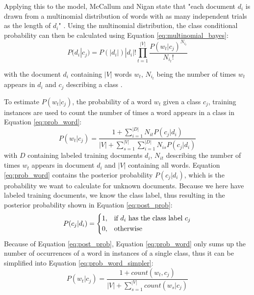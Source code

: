         Applying this to the model, McCallum and Nigan state that "each document $d_i$ is drawn from a multinomial distribution of words with as many independent trials as the length of $d_i$" \cite[p.~3]{Mccallum1998}. Using the multinomial distribution, the class conditional probability can then be calculated using Equation \eqref{eq:multinomial_bayes}:
        \begin{equation}
            \label{eq:multinomial_bayes}
                P(d_i|c_j) = P(|d_i|)|d_i|!\prod_{t=1}^{|V|}\frac{P(w_t|c_j)^{N_{i_t}}}{N_{i_t}!}
        \end{equation}
        
        with the document $d_i$ containing $|V|$ words $w_t$, $N_{i_t}$ being the number of times $w_t$ appears in $d_i$ and $c_j$ describing a class \cite{Mccallum1998}. 
        
        To estimate $P(w_t|c_j)$, the probability of a word $w_t$ given a class $c_j$, training instances are used to count the number of times a word appears in a class in Equation \eqref{eq:prob_word}:
        \begin{equation}
            \label{eq:prob_word}
                P(w_t|c_j) = \frac{1 + \sum_{i=1}^{|D|}N_{it} P(c_j|d_i)}{|V| + \sum_{s=1}^{|V|} \sum_{i=1}^{|D|}N_{is} P (c_j|d_i)} 
        \end{equation}
        with $D$ containing labeled training documents $d_i$, $N_{it}$ describing the number of times $w_t$ appears in document $d_i$ and $|V|$ containing all words.
        Equation \eqref{eq:prob_word} contains the posterior probability $P(c_j|d_i)$, which is the probability we want to calculate for unknown documents. Because we here have labeled training documents, we know the class label, thus resulting in the posterior probability shown in Equation \eqref{eq:post_prob}:
        \begin{equation}
                \label{eq:post_prob}
                P(c_j|d_i)= 
                \begin{dcases}
                1,& \text{if } d_i \text{ has the class label } c_j \\
                0,              & \text{otherwise}
        \end{dcases}
        \end{equation}
        Because of Equation \eqref{eq:post_prob}, Equation \eqref{eq:prob_word} only sums up the number of occurrences of a word in instances of a single class, thus it can be simplified into Equation \eqref{eq:prob_word_simpler}:
                \begin{equation}
            \label{eq:prob_word_simpler}
                P(w_t|c_j) = \frac{1 + count(w_t, c_j)}{|V| + \sum_{s=1}^{|V|}count(w_s|c_j)} 
        \end{equation}

